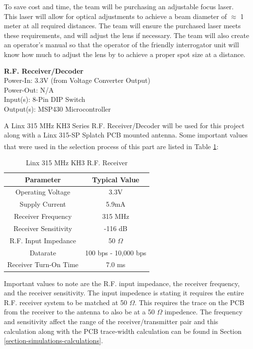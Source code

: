 \documentclass[letterpaper,10pt]{article}
\begin{document}
\begin{spacing}{1.15}
To save cost and time, the team will be purchasing an adjustable focus laser. This laser will allow for optical adjustments to achieve a beam diameter of $\approx$ 1 meter at all required distances. The team will ensure the purchased laser meets these requirements, and will adjust the lens if necessary. The team will also create an operator's manual so that the operator of the friendly interrogator unit will know how much to adjust the lens by to achieve a proper spot size at a distance.

\normalsize\textbf{R.F. Receiver/Decoder} \\
Power-In: 3.3V (from Voltage Converter Output) \\
Power-Out: N/A \\
Input(s): 8-Pin DIP Switch\\
Output(s): MSP430 Microcontroller

A Linx 315 MHz KH3 Series R.F. Receiver/Decoder will be used for this project along with a Linx 315-SP Splatch PCB mounted antenna. Some important values that were used in the selection process of this part are listed in Table \ref{tab:rf-receiver-important-values}\textsuperscript{\cite{Linx-Receiver}\cite{Linx-Antenna}}:

\begin{table}[htbp]
	\centering
	\begin{tabular}{c|c}	%
		\toprule	%
		Parameter & Typical Value \\
		\midrule
		Operating Voltage & 3.3V\\
		Supply Current & 5.9mA\\
		Receiver Frequency & 315 MHz \\ 
		Receiver Sensitivity & -116 dB \\
		R.F. Input Impedance & 50 $\Omega$ \\
		Datarate & 100 bps - 10,000 bps  \\
		Receiver Turn-On Time & 7.0 ms  \\
		\bottomrule	%
	\end{tabular}%
	\caption{Linx 315 MHz KH3 R.F. Receiver}
	\label{tab:rf-receiver-important-values}	%
\end{table}%

Important values to note are the R.F. input impedance, the receiver frequency, and the receiver sensitivity. The input impedence is stating it requires the entire R.F. receiver system to be matched at 50 $\Omega$. This requires the trace on the PCB from the receiver to the antenna to also be at a 50 $\Omega$ impedence. The frequency and sensitivity affect the range of the receiver/transmitter pair and this calculation along with the PCB trace-width calculation can be found in Section \ref{section-simulations-calculations}.


\end{spacing}
\end{document}
